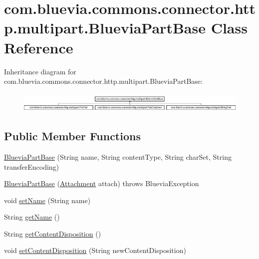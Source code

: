 \hypertarget{classcom_1_1bluevia_1_1commons_1_1connector_1_1http_1_1multipart_1_1BlueviaPartBase}{
\section{com.bluevia.commons.connector.http.multipart.BlueviaPartBase Class Reference}
\label{classcom_1_1bluevia_1_1commons_1_1connector_1_1http_1_1multipart_1_1BlueviaPartBase}
}
Inheritance diagram for com.bluevia.commons.connector.http.multipart.BlueviaPartBase:\begin{figure}[H]
\begin{center}
\leavevmode
\includegraphics[height=0.990274cm]{classcom_1_1bluevia_1_1commons_1_1connector_1_1http_1_1multipart_1_1BlueviaPartBase}
\end{center}
\end{figure}
\subsection*{Public Member Functions}
\begin{DoxyCompactItemize}
\item 
\hyperlink{classcom_1_1bluevia_1_1commons_1_1connector_1_1http_1_1multipart_1_1BlueviaPartBase_a2e8377ce065bdb8102b06f50635f6ae7}{BlueviaPartBase} (String name, String contentType, String charSet, String transferEncoding)
\item 
\hyperlink{classcom_1_1bluevia_1_1commons_1_1connector_1_1http_1_1multipart_1_1BlueviaPartBase_a14252ca9ab3010ed3f6174d1099eeb5f}{BlueviaPartBase} (\hyperlink{classcom_1_1bluevia_1_1messagery_1_1mt_1_1mms_1_1data_1_1Attachment}{Attachment} attach)  throws BlueviaException 
\item 
void \hyperlink{classcom_1_1bluevia_1_1commons_1_1connector_1_1http_1_1multipart_1_1BlueviaPartBase_a288efd84e0f6dbe2ac9a53186217b57f}{setName} (String name)
\item 
String \hyperlink{classcom_1_1bluevia_1_1commons_1_1connector_1_1http_1_1multipart_1_1BlueviaPartBase_a09c3c31644388507a14d1b9b96cc0c15}{getName} ()
\item 
String \hyperlink{classcom_1_1bluevia_1_1commons_1_1connector_1_1http_1_1multipart_1_1BlueviaPartBase_ab1869a68f3151dd7b9403ba4351eac0a}{getContentDisposition} ()
\item 
void \hyperlink{classcom_1_1bluevia_1_1commons_1_1connector_1_1http_1_1multipart_1_1BlueviaPartBase_af269550f9236dbb0f03dcca55a760954}{setContentDisposition} (String newContentDisposition)
\end{DoxyCompactItemize}

